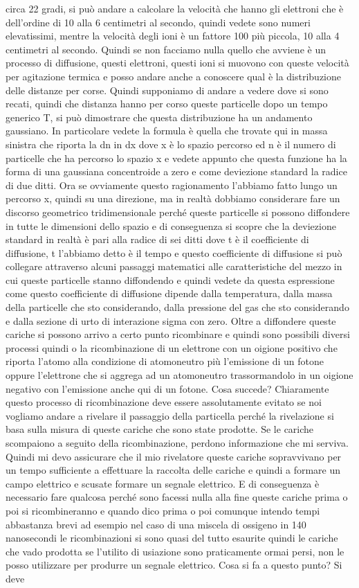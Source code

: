 {circa 22 gradi, si può andare a calcolare la velocità che hanno gli elettroni che è dell'ordine di 10 alla 6 centimetri al secondo, quindi vedete sono numeri elevatissimi, mentre la velocità degli ioni è un fattore 100 più piccola, 10 alla 4 centimetri al secondo. Quindi se non facciamo nulla quello che avviene è un processo di diffusione, questi elettroni, questi ioni si muovono con queste velocità per agitazione termica e posso andare anche a conoscere qual è la distribuzione delle distanze per corse. Quindi supponiamo di andare a vedere dove si sono recati, quindi che distanza hanno per corso queste particelle dopo un tempo generico T, si può dimostrare che questa distribuzione ha un andamento gaussiano. In particolare vedete la formula è quella che trovate qui in massa sinistra che riporta la dn in dx dove x è lo spazio percorso ed n è il numero di particelle che ha percorso lo spazio x e vedete appunto che questa funzione ha la forma di una gaussiana concentroide a zero e come deviezione standard la radice di due ditti. Ora se ovviamente questo ragionamento l'abbiamo fatto lungo un percorso x, quindi su una direzione, ma in realtà dobbiamo considerare fare un discorso geometrico tridimensionale perché queste particelle si possono diffondere in tutte le dimensioni dello spazio e di conseguenza si scopre che la deviezione standard in realtà è pari alla radice di sei ditti dove t è il coefficiente di diffusione, t l'abbiamo detto è il tempo e questo coefficiente di diffusione si può collegare attraverso alcuni passaggi matematici alle caratteristiche del mezzo in cui queste particelle stanno diffondendo e quindi vedete da questa espressione come questo coefficiente di diffusione dipende dalla temperatura, dalla massa della particelle che sto considerando, dalla pressione del gas che sto considerando e dalla sezione di urto di interazione sigma con zero. Oltre a diffondere queste cariche si possono arrivo a certo punto ricombinare e quindi sono possibili diversi processi quindi o la ricombinazione di un elettrone con un oigione positivo che riporta l'atomo alla condizione di atomoneutro più l'emissione di un fotone oppure l'elettrone che si aggrega ad un atomoneutro trassormandolo in un oigione negativo con l'emissione anche qui di un fotone. Cosa succede? Chiaramente questo processo di ricombinazione deve essere assolutamente evitato se noi vogliamo andare a rivelare il passaggio della particella perché la rivelazione si basa sulla misura di queste cariche che sono state prodotte. Se le cariche scompaiono a seguito della ricombinazione, perdono informazione che mi serviva. Quindi mi devo assicurare che il mio rivelatore queste cariche sopravvivano per un tempo sufficiente a effettuare la raccolta delle cariche e quindi a formare un campo elettrico e scusate formare un segnale elettrico. E di conseguenza è necessario fare qualcosa perché sono facessi nulla alla fine queste cariche prima o poi si ricombineranno e quando dico prima o poi comunque intendo tempi abbastanza brevi ad esempio nel caso di una miscela di ossigeno in 140 nanosecondi le ricombinazioni si sono quasi del tutto esaurite quindi le cariche che vado prodotta se l'utilito di usiazione sono praticamente ormai persi, non le posso utilizzare per produrre un segnale elettrico. Cosa si fa a questo punto? Si deve }
